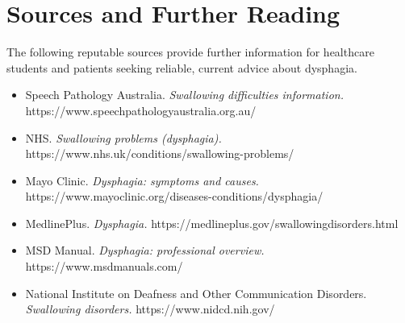 \section*{Sources and Further Reading}
The following reputable sources provide further information for healthcare students and patients seeking reliable, current advice about dysphagia.
\begin{itemize}
    \item Speech Pathology Australia. \textit{Swallowing difficulties information.} https://www.speechpathologyaustralia.org.au/
    \item NHS. \textit{Swallowing problems (dysphagia).} https://www.nhs.uk/conditions/swallowing-problems/
    \item Mayo Clinic. \textit{Dysphagia: symptoms and causes.} https://www.mayoclinic.org/diseases-conditions/dysphagia/
    \item MedlinePlus. \textit{Dysphagia.} https://medlineplus.gov/swallowingdisorders.html
    \item MSD Manual. \textit{Dysphagia: professional overview.} https://www.msdmanuals.com/
    \item National Institute on Deafness and Other Communication Disorders. \textit{Swallowing disorders.} https://www.nidcd.nih.gov/
\end{itemize}
